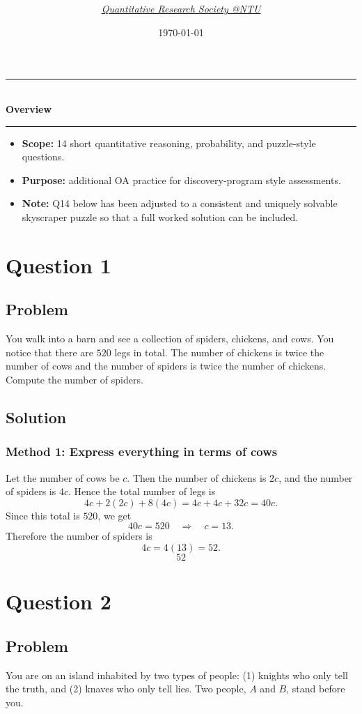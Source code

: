 \documentclass[12pt]{article}
\title{
\Huge \CourseCode\ \CourseName \\[0.3em]
\Large \DocType \\[0.3em]
\ExamMeta
}
\author{
  \textit{\href{https://qrsntu.org}{Quantitative Research Society @NTU}}
}
\date{\today}
\newenvironment{overview}{
  \par\bigskip
  \begin{center}
    \rule{0.92\linewidth}{0.6pt}\\[-0.2em]
    \textbf{Overview}\\[-0.2em]
    \rule{0.92\linewidth}{0.6pt}
  \end{center}
  \vspace{-0.3em}
  \begin{itemize}[leftmargin=1.6em, itemsep=0.2em, topsep=0.2em]
}{
  \end{itemize}
  \par\bigskip
}
\begin{document}
\maketitle
\thispagestyle{plainfirst}
\pagestyle{main}

\begin{overview}
  \item \textbf{Scope:} 14 short quantitative reasoning, probability, and puzzle-style questions.
  \item \textbf{Purpose:} additional OA practice for discovery-program style assessments.
  \item \textbf{Note:} Q14 below has been adjusted to a consistent and uniquely solvable skyscraper puzzle so that a full worked solution can be included.
\end{overview}

\newpage
\tableofcontents
\newpage

\section{Question 1}
\subsection{Problem}
You walk into a barn and see a collection of spiders, chickens, and cows. You notice that there are $520$ legs in total. The number of chickens is twice the number of cows and the number of spiders is twice the number of chickens. Compute the number of spiders.

\subsection{Solution}
\subsubsection{Method 1: Express everything in terms of cows}
Let the number of cows be $c$. Then the number of chickens is $2c$, and the number of spiders is $4c$.
Hence the total number of legs is
\[
4c + 2(2c) + 8(4c) = 4c + 4c + 32c = 40c.
\]
Since this total is $520$, we get
\[
40c = 520 \quad\Rightarrow\quad c = 13.
\]
Therefore the number of spiders is
\[
4c = 4(13) = 52.
\]
\[
\boxed{52}
\]

\section{Question 2}
\subsection{Problem}
You are on an island inhabited by two types of people: (1) knights who only tell the truth, and (2) knaves who only tell lies. Two people, $A$ and $B$, stand before you.
\end{document}
